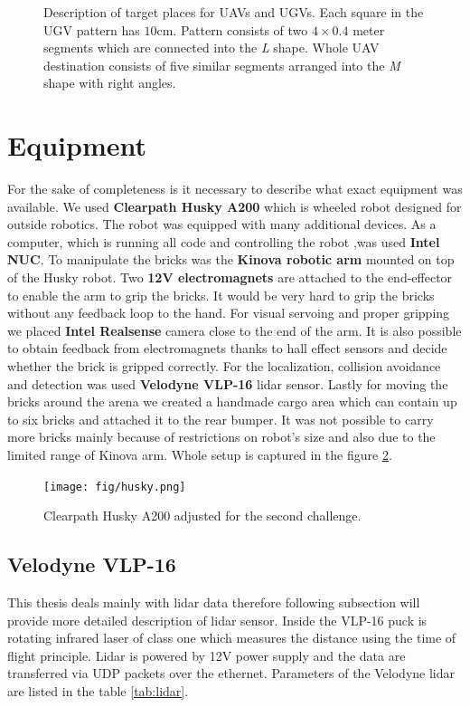 \begin{figure}[H]
\caption[Brick destinations]{Description of target places for UAVs and UGVs. Each square in the UGV pattern has $10$cm. Pattern consists of two $4\times0.4$ meter segments which are connected into the \textit{L} shape. Whole UAV destination consists of five similar segments arranged into the \textit{M} shape with right angles.}
\label{fig:dest}
\end{figure}


\section{Equipment}
For the sake of completeness is it necessary to describe what exact equipment was available. We used \textbf{Clearpath Husky A200} which is wheeled robot designed for outside robotics. The robot was equipped with many additional devices. As a computer, which is running all code and controlling the robot ,was used \textbf{Intel NUC}. To manipulate the bricks was the \textbf{Kinova robotic arm} mounted on top of the Husky robot. Two \textbf{12V electromagnets} are attached to the end-effector to enable the arm to grip the bricks. It would be very hard to grip the bricks without any feedback loop to the hand. For visual servoing and proper gripping we placed \textbf{Intel Realsense} camera close to the end of the arm. It is also possible to obtain feedback from electromagnets thanks to hall effect sensors and decide whether the brick is gripped correctly. For the localization, collision avoidance and detection was used \textbf{Velodyne VLP-16} lidar sensor. Lastly for moving the bricks around the arena we created a handmade cargo area which can contain up to six bricks and attached it to the rear bumper. It was not possible to carry more bricks mainly because of restrictions on robot's size and also due to the limited range of Kinova arm. Whole setup is captured in the figure \ref{fig:husky}.

\begin{figure}[H]
\centering
\texttt{[image: fig/husky.png]}
\caption[UGV robot setup]{Clearpath Husky A200 adjusted for the second challenge.}
\label{fig:husky}

\end{figure}

\subsection{Velodyne VLP-16}
This thesis deals mainly with lidar data therefore following subsection will provide more detailed description of lidar sensor. Inside the VLP-16 puck is rotating infrared laser of class one which measures the distance using the time of flight principle. Lidar is powered by 12V power supply and the data are transferred via UDP packets over the ethernet. Parameters of the Velodyne lidar are listed in the table \ref{tab:lidar}.

